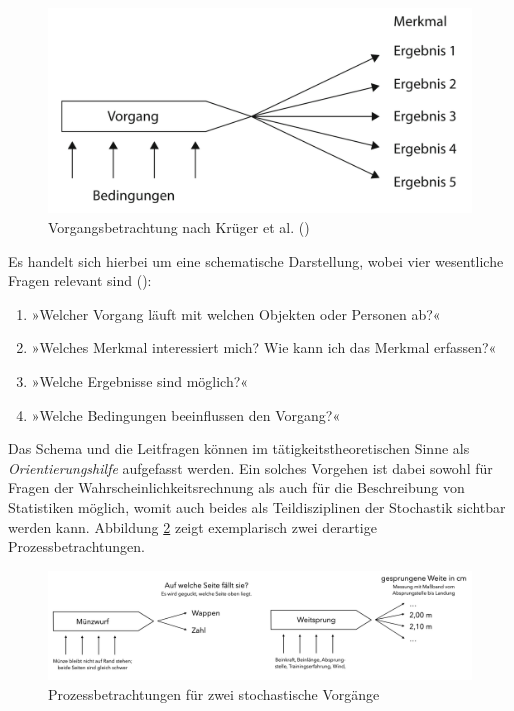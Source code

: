 \documentclass[
]{scrbook}
\providecommand{\tightlist}{%
  \setlength{\itemsep}{0pt}\setlength{\parskip}{0pt}}
\theoremstyle{definition}
\theoremstyle{definition}
\theoremstyle{definition}
\theoremstyle{definition}
\theoremstyle{remark}
\begin{document}
\begin{figure}

{\centering \includegraphics[width=0.75\linewidth]{pictures/12-Prozessbetrachtung} 

}

\caption{Vorgangsbetrachtung nach Krüger et al. ()}\label{fig:Prozessbetrachtung}
\end{figure}

Es handelt sich hierbei um eine schematische Darstellung, wobei vier wesentliche Fragen relevant sind ():

\begin{enumerate}
\def\labelenumi{\arabic{enumi}.}
\tightlist
\item
  »Welcher Vorgang läuft mit welchen Objekten oder Personen ab?«
\item
  »Welches Merkmal interessiert mich? Wie kann ich das Merkmal erfassen?«
\item
  »Welche Ergebnisse sind möglich?«
\item
  »Welche Bedingungen beeinflussen den Vorgang?«
\end{enumerate}

Das Schema und die Leitfragen können im tätigkeitstheoretischen Sinne als \emph{Orientierungshilfe} aufgefasst werden. Ein solches Vorgehen ist dabei sowohl für Fragen der Wahrscheinlichkeitsrechnung als auch für die Beschreibung von Statistiken möglich, womit auch beides als Teildisziplinen der Stochastik sichtbar werden kann. Abbildung \ref{fig:Prozesse} zeigt exemplarisch zwei derartige Prozessbetrachtungen.

\begin{figure}

{\centering \includegraphics[width=0.95\linewidth]{pictures/12-Prozesse} 

}

\caption{Prozessbetrachtungen für zwei stochastische Vorgänge}\label{fig:Prozesse}
\end{figure}
\end{document}
